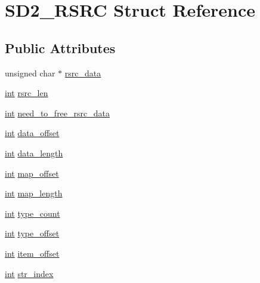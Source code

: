 \hypertarget{struct_s_d2___r_s_r_c}{}\section{S\+D2\+\_\+\+R\+S\+RC Struct Reference}
\label{struct_s_d2___r_s_r_c}
\subsection*{Public Attributes}
\begin{DoxyCompactItemize}
\item 
unsigned char $\ast$ \hyperlink{struct_s_d2___r_s_r_c_a92dba91b4f50afe7c8cd82d8eace6ea0}{rsrc\+\_\+data}
\item 
\hyperlink{xmltok_8h_a5a0d4a5641ce434f1d23533f2b2e6653}{int} \hyperlink{struct_s_d2___r_s_r_c_a2c635d835a86076b87b432d8090424a7}{rsrc\+\_\+len}
\item 
\hyperlink{xmltok_8h_a5a0d4a5641ce434f1d23533f2b2e6653}{int} \hyperlink{struct_s_d2___r_s_r_c_af28995008ac1e02abf50177adcd61da8}{need\+\_\+to\+\_\+free\+\_\+rsrc\+\_\+data}
\item 
\hyperlink{xmltok_8h_a5a0d4a5641ce434f1d23533f2b2e6653}{int} \hyperlink{struct_s_d2___r_s_r_c_a83624ede6bc794f851a209a368f1ee0f}{data\+\_\+offset}
\item 
\hyperlink{xmltok_8h_a5a0d4a5641ce434f1d23533f2b2e6653}{int} \hyperlink{struct_s_d2___r_s_r_c_a5676006382ec5fdaad49ab44d67a94ea}{data\+\_\+length}
\item 
\hyperlink{xmltok_8h_a5a0d4a5641ce434f1d23533f2b2e6653}{int} \hyperlink{struct_s_d2___r_s_r_c_ae87008f19554b3f6000b6f3dabad2ec3}{map\+\_\+offset}
\item 
\hyperlink{xmltok_8h_a5a0d4a5641ce434f1d23533f2b2e6653}{int} \hyperlink{struct_s_d2___r_s_r_c_adab12895f19fd3a3a4a63adbc733fbed}{map\+\_\+length}
\item 
\hyperlink{xmltok_8h_a5a0d4a5641ce434f1d23533f2b2e6653}{int} \hyperlink{struct_s_d2___r_s_r_c_ac55968ca4d7f908f39fd952237509886}{type\+\_\+count}
\item 
\hyperlink{xmltok_8h_a5a0d4a5641ce434f1d23533f2b2e6653}{int} \hyperlink{struct_s_d2___r_s_r_c_a7d3803f0070580106e4aaa0807fc486a}{type\+\_\+offset}
\item 
\hyperlink{xmltok_8h_a5a0d4a5641ce434f1d23533f2b2e6653}{int} \hyperlink{struct_s_d2___r_s_r_c_a389d3a59bb7d963f40b032ff143f4da3}{item\+\_\+offset}
\item 
\hyperlink{xmltok_8h_a5a0d4a5641ce434f1d23533f2b2e6653}{int} \hyperlink{struct_s_d2___r_s_r_c_a5567f2ff28ad5ab2124580e7f3a4af29}{str\+\_\+index}

\end{DoxyCompactItemize}
